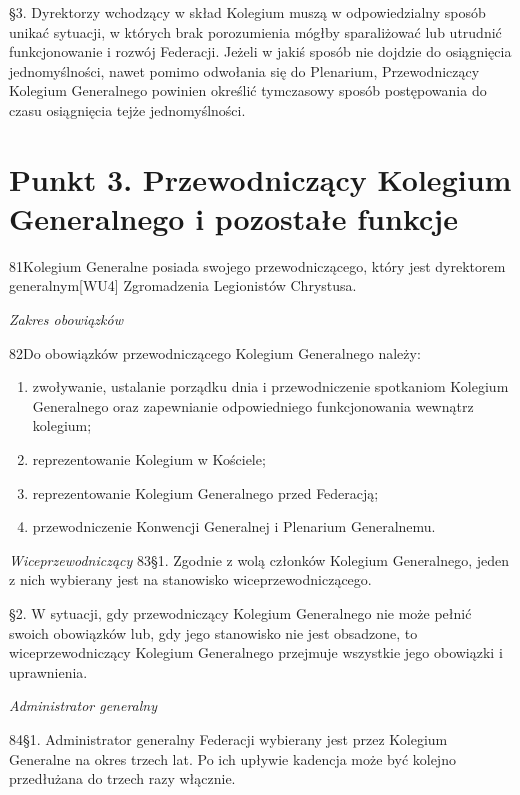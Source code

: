 ﻿\documentclass{book}
\newcommand{\lett}[1]{\lettrine[findent=6pt]{#1}}
\newcommand{\ssec}[1]{\vspace{1em}\textit{#1}\vspace{.5em}\nopagebreak}
\begin{document}
\S{}3. Dyrektorzy wchodzący w skład Kolegium muszą w odpowiedzialny sposób unikać sytuacji, w których brak porozumienia mógłby sparaliżować lub utrudnić funkcjonowanie i rozwój Federacji. Jeżeli w jakiś sposób nie dojdzie do osiągnięcia jednomyślności, nawet pomimo odwołania się do Plenarium, Przewodniczący Kolegium Generalnego powinien określić tymczasowy sposób postępowania do czasu osiągnięcia tejże jednomyślności.
 
\section{Punkt 3. Przewodniczący Kolegium Generalnego i pozostałe funkcje}
 
\lett{81} Kolegium Generalne posiada swojego przewodniczącego, który jest dyrektorem generalnym[WU4]  Zgromadzenia Legionistów Chrystusa.
 
\ssec{Zakres obowiązków}


\lett{82} Do obowiązków przewodniczącego Kolegium Generalnego należy:


\begin{enumerate}


\item zwoływanie, ustalanie porządku dnia i przewodniczenie spotkaniom Kolegium Generalnego oraz zapewnianie odpowiedniego funkcjonowania wewnątrz kolegium;


\item reprezentowanie Kolegium w Kościele;


\item reprezentowanie Kolegium Generalnego przed Federacją;


\item przewodniczenie Konwencji Generalnej i Plenarium Generalnemu.


\end{enumerate}


\ssec{Wiceprzewodniczący}
\lett{83} \S{}1. Zgodnie z wolą członków Kolegium Generalnego, jeden z nich wybierany jest na stanowisko wiceprzewodniczącego.


\S{}2. W sytuacji, gdy przewodniczący Kolegium Generalnego nie może pełnić swoich obowiązków lub, gdy jego stanowisko nie jest obsadzone, to wiceprzewodniczący Kolegium Generalnego przejmuje wszystkie jego obowiązki i uprawnienia.
 
\ssec{Administrator generalny}


\lett{84} \S{}1. Administrator generalny Federacji wybierany jest przez Kolegium Generalne na okres trzech lat. Po ich upływie kadencja może być kolejno przedłużana do trzech razy włącznie.
\end{document}
